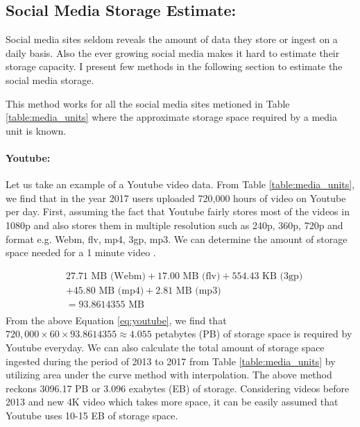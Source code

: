 \subsection*{Social Media Storage Estimate:}
Social media sites seldom reveals the amount of data they store or ingest on a daily basis. Also the ever growing social media makes it hard to estimate their storage capacity. I present few methods in the following section to estimate the social media storage.

This method works for all the social media sites metioned in Table \ref{table:media_units} where the approximate storage space required by a media unit is known.

\paragraph{Youtube:}
Let us take an example of a Youtube video data. From Table  \ref{table:media_units}, we find that in the year 2017 users uploaded 720,000 hours of video on Youtube per day. First, assuming the fact that Youtube fairly stores most of the videos
 in 1080p and also stores them in multiple resolution such as 240p, 360p, 720p and format e.g. Webm, flv, mp4, 3gp, mp3. We can determine the amount of storage space needed for a 1 minute video \cite{youtube_stats}.

\begin{equation}
\begin{split}
  &27.71 \text{ MB (Webm)} + 17.00 \text{ MB (flv)} + 554.43 \text{ KB (3gp)} \\
  &+ 45.80 \text{ MB (mp4)} + 2.81 \text{ MB (mp3)}\\
  &= 93.8614355 \text{ MB}\\
  \end{split}
  \label{eq:youtube}
\end{equation}
 From the above Equation \ref{eq:youtube}, we find that $720,000 \times 60 \times 93.8614355 \approx 4.055$ petabytes (PB)  of storage space is required by Youtube everyday. We can also calculate the total amount of storage space ingested during the period of 2013 to 2017 from Table \ref{table:media_units} by utilizing area under the curve method with interpolation. The above method reckons 3096.17 PB or 3.096 exabytes (EB) of storage. Considering videos before 2013 and new 4K video which takes more space, it can be easily assumed that Youtube uses 10-15 EB of storage space.

